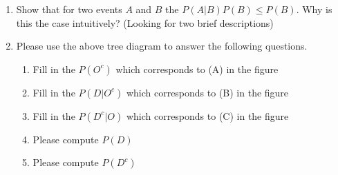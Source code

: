 \begin{enumerate}
   \item Show that for two events $A$ and $B$ the $P(A|B)P(B)  \leq P(B)$. Why is this the case intuitively? (Looking for two brief descriptions)
   \clearpage
   \item \begin{figure}[ht!]
       \centering
   \end{figure} Please use the above tree diagram to answer the following questions. 
   \begin{enumerate}
       \item Fill in the $P(O^{c})$ which corresponds to (A) in the figure
       \item Fill in the $P(D | O^{c})$ which corresponds to (B) in the figure
       \item Fill in the $P(D^{c} | O)$ which corresponds to (C) in the figure
       \item Please compute $P(D)$
       \item Please compute $P(D^{c})$
   \end{enumerate}
   

\end{enumerate}
